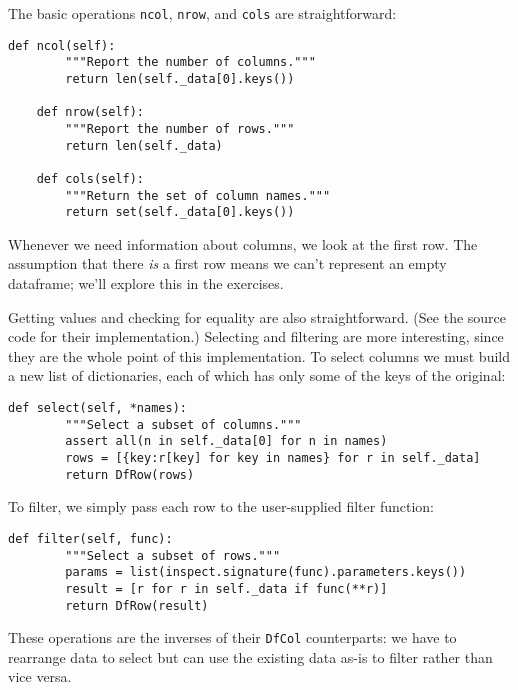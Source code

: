\documentclass{scrbook}
\begin{document}
The basic operations \texttt{ncol}, \texttt{nrow}, and \texttt{cols} are straightforward:


\begin{lstlisting}[frame=single,frameround=tttt]
    def ncol(self):
        """Report the number of columns."""
        return len(self._data[0].keys())

    def nrow(self):
        """Report the number of rows."""
        return len(self._data)

    def cols(self):
        """Return the set of column names."""
        return set(self._data[0].keys())
\end{lstlisting}



\noindent Whenever we need information about columns,
we look at the first row.
The assumption that there \emph{is} a first row means we can't represent
an empty dataframe;
we'll explore this in the exercises.


Getting values and checking for equality are also straightforward.
(See the source code for their implementation.)
Selecting and filtering are more interesting,
since they are the whole point of this implementation.
To select columns we must build a new list of dictionaries,
each of which has only some of the keys of the original:


\begin{lstlisting}[frame=single,frameround=tttt]
    def select(self, *names):
        """Select a subset of columns."""
        assert all(n in self._data[0] for n in names)
        rows = [{key:r[key] for key in names} for r in self._data]
        return DfRow(rows)
\end{lstlisting}



\noindent To filter,
we simply pass each row to the user-supplied filter function:


\begin{lstlisting}[frame=single,frameround=tttt]
    def filter(self, func):
        """Select a subset of rows."""
        params = list(inspect.signature(func).parameters.keys())
        result = [r for r in self._data if func(**r)]
        return DfRow(result)
\end{lstlisting}



These operations are the inverses of their \texttt{DfCol} counterparts:
we have to rearrange data to select
but can use the existing data as-is to filter
rather than vice versa.
\end{document}

